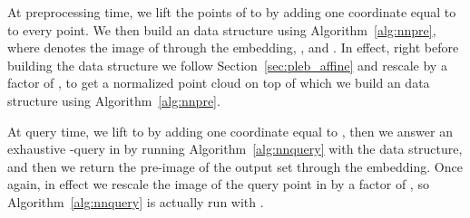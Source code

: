 At preprocessing time, we lift the points of  to  by adding one coordinate equal to  to every point. We then
build an  data structure using
Algorithm~\ref{alg:nnpre}, where  denotes the image of  through
the embedding, , and
.  In effect, right before
building the data structure we follow
Section~\ref{sec:pleb_affine} and rescale  by a factor of ,
to get a normalized point cloud  on top of which we build
an  data structure using Algorithm~\ref{alg:nnpre}.

At query time, we lift  to  by adding one coordinate
equal to , then we answer an exhaustive
-\pleb query in  by running Algorithm~\ref{alg:nnquery}
with the  data structure, and then we return the
pre-image of the output set through the embedding. Once again, in
effect we rescale the image of the query point in  by a
factor of , so Algorithm~\ref{alg:nnquery} is actually run
with .


